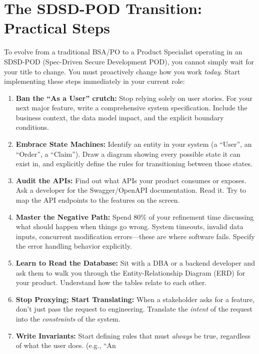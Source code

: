 \documentclass[
  11pt,
  openany,
  oneside]{book}
\providecommand{\tightlist}{%
  \setlength{\itemsep}{0pt}\setlength{\parskip}{0pt}}
\begin{document}
\bigskip

\section{The SDSD-POD Transition: Practical
Steps}\label{the-sdsd-pod-transition-practical-steps}

To evolve from a traditional BSA/PO to a Product Specialist operating in
an SDSD-POD (Spec-Driven Secure Development POD), you cannot simply wait
for your title to change. You must proactively change how you work
\emph{today}. Start implementing these steps immediately in your current
role:

\begin{enumerate}
\def\labelenumi{\arabic{enumi}.}
\tightlist
\item
  \textbf{Ban the ``As a User'' crutch:} Stop relying solely on user
  stories. For your next major feature, write a comprehensive system
  specification. Include the business context, the data model impact,
  and the explicit boundary conditions.
\item
  \textbf{Embrace State Machines:} Identify an entity in your system (a
  ``User'', an ``Order'', a ``Claim''). Draw a diagram showing every
  possible state it can exist in, and explicitly define the rules for
  transitioning between those states.
\item
  \textbf{Audit the APIs:} Find out what APIs your product consumes or
  exposes. Ask a developer for the Swagger/OpenAPI documentation. Read
  it. Try to map the API endpoints to the features on the screen.
\item
  \textbf{Master the Negative Path:} Spend 80\% of your refinement time
  discussing what should happen when things go wrong. System timeouts,
  invalid data inputs, concurrent modification errors---these are where
  software fails. Specify the error handling behavior explicitly.
\item
  \textbf{Learn to Read the Database:} Sit with a DBA or a backend
  developer and ask them to walk you through the Entity-Relationship
  Diagram (ERD) for your product. Understand how the tables relate to
  each other.
\item
  \textbf{Stop Proxying; Start Translating:} When a stakeholder asks for
  a feature, don't just pass the request to engineering. Translate the
  \emph{intent} of the request into the \emph{constraints} of the
  system.
\item
  \textbf{Write Invariants:} Start defining rules that must
  \emph{always} be true, regardless of what the user does. (e.g., ``An

\end{enumerate}
\end{document}

